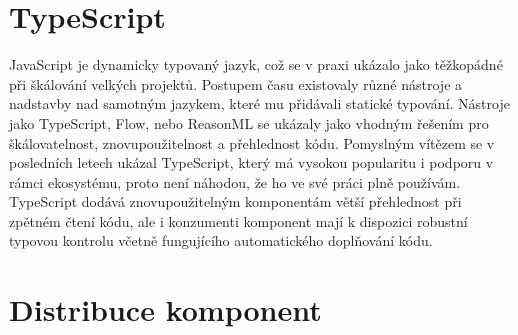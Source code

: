 


\section{TypeScript}

JavaScript je dynamicky typovaný jazyk, což se v praxi ukázalo jako těžkopádné při škálování velkých projektů.
Postupem času existovaly různé nástroje a nadstavby nad samotným jazykem, které mu přidávali statické typování.
Nástroje jako TypeScript, Flow, nebo ReasonML se ukázaly jako vhodným řešením pro škálovatelnost, znovupoužitelnost a přehlednost kódu.
Pomyslným vítězem se v posledních letech ukázal TypeScript, který má vysokou popularitu i podporu v rámci ekosystému, proto není náhodou, že ho ve své práci plně používám.
TypeScript dodává znovupoužitelným komponentám větší přehlednost při zpětném čtení kódu, ale i konzumenti komponent mají k dispozici robustní typovou kontrolu včetně fungujícího automatického doplňování kódu.

\section{Distribuce komponent}

